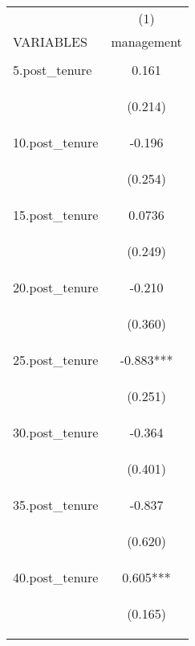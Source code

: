 \begin{center}
\begin{tabular}{lc} \hline
 & (1) \\
VARIABLES & management \\ \hline
\vspace{4pt} & \begin{footnotesize}\end{footnotesize} \\
5.post\_tenure & 0.161 \\
\vspace{4pt} & \begin{footnotesize}(0.214)\end{footnotesize} \\
10.post\_tenure & -0.196 \\
\vspace{4pt} & \begin{footnotesize}(0.254)\end{footnotesize} \\
15.post\_tenure & 0.0736 \\
\vspace{4pt} & \begin{footnotesize}(0.249)\end{footnotesize} \\
20.post\_tenure & -0.210 \\
\vspace{4pt} & \begin{footnotesize}(0.360)\end{footnotesize} \\
25.post\_tenure & -0.883*** \\
\vspace{4pt} & \begin{footnotesize}(0.251)\end{footnotesize} \\
30.post\_tenure & -0.364 \\
\vspace{4pt} & \begin{footnotesize}(0.401)\end{footnotesize} \\
35.post\_tenure & -0.837 \\
\vspace{4pt} & \begin{footnotesize}(0.620)\end{footnotesize} \\
40.post\_tenure & 0.605*** \\
\vspace{4pt} & \begin{footnotesize}(0.165)\end{footnotesize} \\

\end{tabular}
\end{center}

